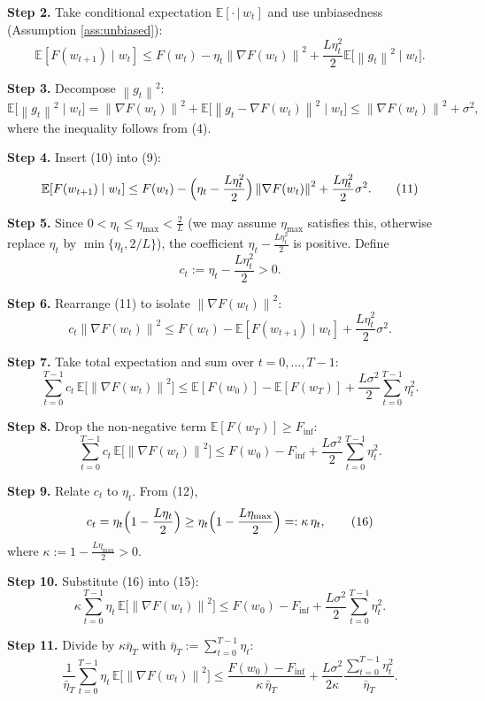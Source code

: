 \documentclass{article}
\newcommand{\E}{\mathbb{E}}
\newcommand{\norm}[1]{\left\|#1\right\|}
\begin{document}
\noindent\textbf{Step 2.} Take conditional expectation $\E[\cdot\,|\,w_t]$ and use unbiasedness (Assumption \ref{ass:unbiased}):
\[
\E[F(w_{t+1})\mid w_t]\le F(w_t)-\eta_t\norm{\nabla F(w_t)}^{2}
      +\frac{L\eta_t^{2}}{2}\E\!\bigl[\norm{g_t}^{2}\mid w_t\bigr].
\tag{9}
\]

\noindent\textbf{Step 3.} Decompose $\norm{g_t}^{2}$:
\[
\E\!\bigl[\norm{g_t}^{2}\mid w_t\bigr]
 =\norm{\nabla F(w_t)}^{2}+\E\!\bigl[\norm{g_t-\nabla F(w_t)}^{2}\mid w_t\bigr]
 \le \norm{\nabla F(w_t)}^{2}+\sigma^{2},
\tag{10}
\]
where the inequality follows from (4).

\noindent\textbf{Step 4.} Insert (10) into (9):
\[
\E[F(w_{t+1})\mid w_t]\le F(w_t)-\Bigl(\eta_t-\frac{L\eta_t^{2}}{2}\Bigr)\norm{\nabla F(w_t)}^{2}
      +\frac{L\eta_t^{2}}{2}\sigma^{2}.
\tag{11}
\]

\noindent\textbf{Step 5.} Since $0<\eta_t\le\eta_{\max}<\frac{2}{L}$ (we may assume $\eta_{\max}$ satisfies this, otherwise replace $\eta_t$ by $\min\{\eta_t,2/L\}$), the coefficient $\eta_t-\frac{L\eta_t^{2}}{2}$ is positive. Define 
\[
c_t:=\eta_t-\frac{L\eta_t^{2}}{2}>0 .
\tag{12}
\]

\noindent\textbf{Step 6.} Rearrange (11) to isolate $\norm{\nabla F(w_t)}^{2}$:
\[
c_t\norm{\nabla F(w_t)}^{2}\le F(w_t)-\E[F(w_{t+1})\mid w_t]
                         +\frac{L\eta_t^{2}}{2}\sigma^{2}.
\tag{13}
\]

\noindent\textbf{Step 7.} Take total expectation and sum over $t=0,\dots,T-1$:
\[
\sum_{t=0}^{T-1}c_t\,\E\!\bigl[\norm{\nabla F(w_t)}^{2}\bigr]
\le \E[F(w_0)]-\E[F(w_T)]
   +\frac{L\sigma^{2}}{2}\sum_{t=0}^{T-1}\eta_t^{2}.
\tag{14}
\]

\noindent\textbf{Step 8.} Drop the non‑negative term $\E[F(w_T)]\ge F_{\inf}$:
\[
\sum_{t=0}^{T-1}c_t\,\E\!\bigl[\norm{\nabla F(w_t)}^{2}\bigr]
\le F(w_0)-F_{\inf}
   +\frac{L\sigma^{2}}{2}\sum_{t=0}^{T-1}\eta_t^{2}.
\tag{15}
\]

\noindent\textbf{Step 9.} Relate $c_t$ to $\eta_t$.
From (12),
\[
c_t = \eta_t\Bigl(1-\frac{L\eta_t}{2}\Bigr)
    \ge \eta_t\Bigl(1-\frac{L\eta_{\max}}{2}\Bigr)
    =: \kappa\,\eta_t,
\tag{16}
\]
where $\kappa:=1-\frac{L\eta_{\max}}{2}>0$.

\noindent\textbf{Step 10.} Substitute (16) into (15):
\[
\kappa\sum_{t=0}^{T-1}\eta_t\,\E\!\bigl[\norm{\nabla F(w_t)}^{2}\bigr]
\le F(w_0)-F_{\inf}
   +\frac{L\sigma^{2}}{2}\sum_{t=0}^{T-1}\eta_t^{2}.
\tag{17}
\]

\noindent\textbf{Step 11.} Divide by $\kappa\bar\eta_T$ with $\bar\eta_T:=\sum_{t=0}^{T-1}\eta_t$:
\[
\frac{1}{\bar\eta_T}\sum_{t=0}^{T-1}\eta_t\,\E\!\bigl[\norm{\nabla F(w_t)}^{2}\bigr]
\le
\frac{F(w_0)-F_{\inf}}{\kappa\,\bar\eta_T}
   +\frac{L\sigma^{2}}{2\kappa}\frac{\sum_{t=0}^{T-1}\eta_t^{2}}{\bar\eta_T}.
\tag{18}
\]
\end{document}
